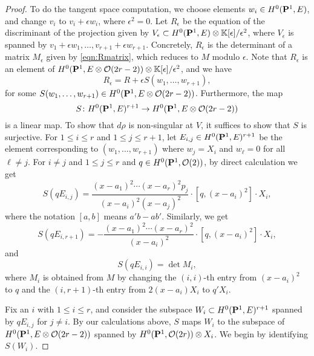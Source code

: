 \begin{proof}
  To do the tangent space computation, we choose elements $w_i \in H^0(\P^1, E)$, and change $v_i$ to $v_i + \epsilon w_i$, where $\epsilon^2 = 0$.
  Let $R_\epsilon$ be the equation of the discriminant of the projection given by $V_\epsilon \subset H^0(\P^1, E) \otimes \k[\epsilon]/\epsilon^2$, where $V_\epsilon$ is spanned by $v_1 + \epsilon w_1, \dots, v_{r+1} + \epsilon w_{r+1}$.
  Concretely, $R_\epsilon$ is the determinant of a matrix $M_\epsilon$ given by \eqref{eqn:Rmatrix}, which reduces to $M$ modulo $\epsilon$.
  Note that $R_\epsilon$ is an element of $H^0(\P^1, E \otimes \O(2r-2)) \otimes \k[\epsilon]/\epsilon^2$, and we have
  \[ R_\epsilon =  R + \epsilon S(w_1, \dots, w_{r+1}),\]
  for some $S(w_1, \dots, w_{r+1}) \in H^0(\P^1, E \otimes \O(2r-2))$.
  Furthermore, the map
  \begin{equation}\label{eqn:mainmap}
    S \from H^0(\P^1, E)^{r+1} \to H^0(\P^1, E \otimes \O(2r-2))
  \end{equation}
  is a linear map.
  To show that $d \rho$ is non-singular at $V$, it suffices to show that $S$ is surjective.
  For $1 \leq i \leq r$ and $1 \leq j \leq r+1$, let $E_{i,j} \in H^0(\P^1, E)^{r+1}$ be the element corresponding to $(w_1, \dots, w_{r+1})$ where $w_j = X_i$ and $w_\ell = 0$ for all $\ell \neq j$.
  For $i \neq j$ and $1 \leq j \leq r$ and $q \in H^0(\P^1, \O(2))$, by direct calculation we get
  \[ S\left(qE_{i,j}\right) = \frac{(x-a_1)^2 \cdots (x-a_r)^2p_j}{(x-a_i)^2(x-a_j)^2} \cdot [q, (x-a_i)^2] \cdot X_i,\]
  where the notation $[a,b]$ means $a'b-ab'$.
  Similarly, we get
  \[ S\left(qE_{i,r+1}\right) = - \frac{(x-a_1)^2 \cdots (x-a_r)^2}{(x-a_i)^2} \cdot [q, (x-a_i)^2] \cdot X_i,\]
  and
  \begin{equation}\label{eqn:diag}
    S\left(qE_{i,i} \right) = \det M_i,
  \end{equation}
  where $M_i$ is obtained from $M$ by changing the $(i,i)$-th entry from $(x-a_i)^2$ to $q$ and the $(i,r+1)$-th entry from $2(x-a_i)X_i$ to $q'X_i$.

  Fix an $i$ with $1 \leq i \leq r$, and consider the subspace $W_i \subset H^0(\P^1, E)^{r+1}$ spanned by $q E_{i,j}$ for $j \neq i$.
  By our calculations above, $S$ maps $W_i$ to the subspace of $H^0(\P^1, E \otimes \O(2r-2))$ spanned by $H^0(\P^1, \O(2r)) \otimes X_i$.
  We begin by identifying $S(W_i)$.


\end{proof}
